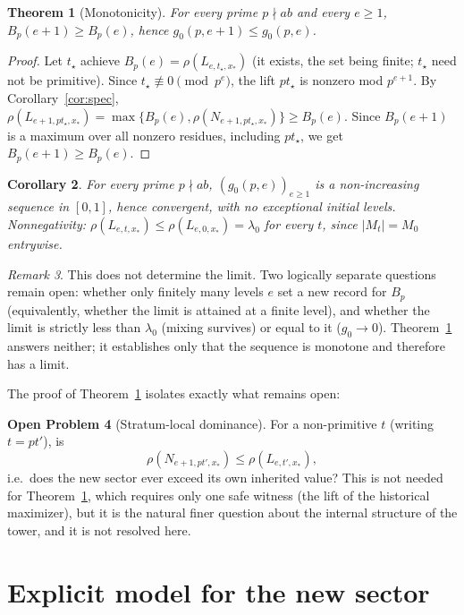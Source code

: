 \documentclass[11pt]{article}
\newtheorem{theorem}{Theorem}
\newtheorem{corollary}[theorem]{Corollary}
\theoremstyle{definition}
\newtheorem{openproblem}[theorem]{Open Problem}
\theoremstyle{remark}
\newtheorem{remark}[theorem]{Remark}
\begin{document}
\begin{theorem}[Monotonicity]\label{thm:mono}
For every prime $p\nmid ab$ and every $e\ge1$, $B_p(e+1)\ge B_p(e)$, hence $g_0(p,e+1)\le g_0(p,e)$.
\end{theorem}

\begin{proof}
Let $t_\star$ achieve $B_p(e)=\rho(L_{e,t_\star,x_*})$ (it exists, the set being finite; $t_\star$ need not be primitive). Since $t_\star\not\equiv0\pmod{p^e}$, the lift $pt_\star$ is nonzero mod $p^{e+1}$. By Corollary~\ref{cor:spec},
$\rho(L_{e+1,pt_\star,x_*})=\max\{B_p(e),\rho(N_{e+1,pt_\star,x_*})\}\ge B_p(e)$. Since $B_p(e+1)$ is a maximum over all nonzero residues, including $pt_\star$, we get $B_p(e+1)\ge B_p(e)$.
\end{proof}

\begin{corollary}\label{cor:conv}
For every prime $p\nmid ab$, $(g_0(p,e))_{e\ge1}$ is a non-increasing sequence in $[0,1]$, hence convergent, with no exceptional initial levels. Nonnegativity: $\rho(L_{e,t,x_*})\le\rho(L_{e,0,x_*})=\lambda_0$ for every $t$, since $|M_t|=M_0$ entrywise.
\end{corollary}

\begin{remark}
This does not determine the limit. Two logically separate questions remain open: whether only finitely many levels $e$ set a new record for $B_p$ (equivalently, whether the limit is attained at a finite level), and whether the limit is strictly less than $\lambda_0$ (mixing survives) or equal to it ($g_0\to0$). Theorem~\ref{thm:mono} answers neither; it establishes only that the sequence is monotone and therefore has a limit.
\end{remark}

The proof of Theorem~\ref{thm:mono} isolates exactly what remains open:

\begin{openproblem}[Stratum-local dominance]\label{op:local}
For a non-primitive $t$ (writing $t=pt'$), is
\[\rho(N_{e+1,pt',x_*})\le\rho(L_{e,t',x_*}),\]
i.e.\ does the new sector ever exceed its own inherited value? This is not needed for Theorem~\ref{thm:mono}, which requires only one safe witness (the lift of the historical maximizer), but it is the natural finer question about the internal structure of the tower, and it is not resolved here.
\end{openproblem}

\section{Explicit model for the new sector}
\end{document}

